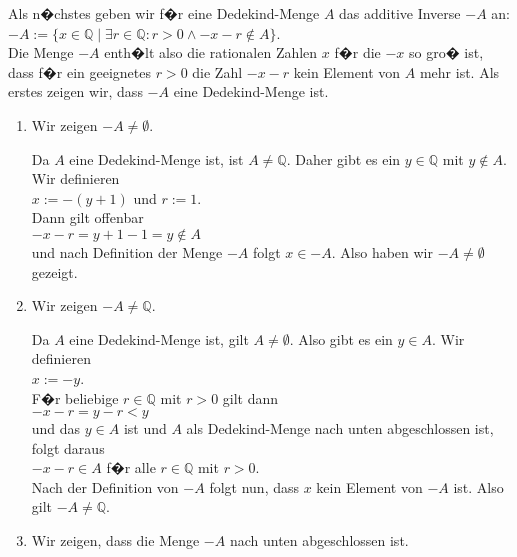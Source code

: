Als n�chstes geben wir f�r eine Dedekind-Menge $A$ das additive Inverse $-\!A$ an:  
\\[0.2cm]
\hspace*{1.3cm}
$-\!A := \{ x \in \mathbb{Q} \mid \exists r \in \mathbb{Q}: r > 0 \wedge -x - r \not\in A \}$.
\\[0.2cm]
Die Menge $-\!A$ enth�lt also die rationalen Zahlen $x$ f�r die $-x$ so gro� ist, dass f�r ein
geeignetes $r > 0$ die Zahl  $-x - r$ kein Element von $A$ mehr ist.  Als erstes zeigen wir, dass 
$-\!A$ eine Dedekind-Menge ist.
\begin{enumerate}
\item Wir zeigen $-\!A \not= \emptyset$.

      Da $A$ eine Dedekind-Menge ist, ist $A \not= \mathbb{Q}$.  Daher gibt es ein $y \in \mathbb{Q}$ 
      mit $y \not\in A$.  Wir definieren 
      \\[0.2cm]
      \hspace*{1.3cm}
      $x := -(y +1)$ \quad und \quad $r := 1$.
      \\[0.2cm]
      Dann gilt offenbar 
      \\[0.2cm]
      \hspace*{1.3cm}
      $-x - r = y + 1 - 1 = y \not\in A$
      \\[0.2cm]
      und nach Definition der Menge $-\!A$ folgt $x \in -\!A$.  Also haben wir $-\!A \not= \emptyset$ gezeigt.
\item Wir zeigen $-\!A \not= \mathbb{Q}$.

      Da $A$ eine Dedekind-Menge ist, gilt $A \not= \emptyset$.  Also gibt es ein $y \in A$.
      Wir definieren
      \\[0.2cm]
      \hspace*{1.3cm}
      $x := -y$.
      \\[0.2cm]
      F�r beliebige $r \in \mathbb{Q}$ mit $r > 0$ gilt dann
      \\[0.2cm]
      \hspace*{1.3cm}
      $-x - r = y - r < y$
      \\[0.2cm]
      und das $y \in A$ ist und $A$ als Dedekind-Menge nach unten abgeschlossen ist, folgt daraus
      \\[0.2cm]
      \hspace*{1.3cm}
      $-x - r \in A$  \quad f�r alle $r \in \mathbb{Q}$ mit $r > 0$.
      \\[0.2cm]
      Nach der Definition von $-\!A$ folgt nun, dass $x$ kein Element von $-\!A$ ist.
      Also gilt $-\!A \not= \mathbb{Q}$.
\item Wir zeigen, dass die Menge $-\!A$ nach unten abgeschlossen ist.


\end{enumerate}
